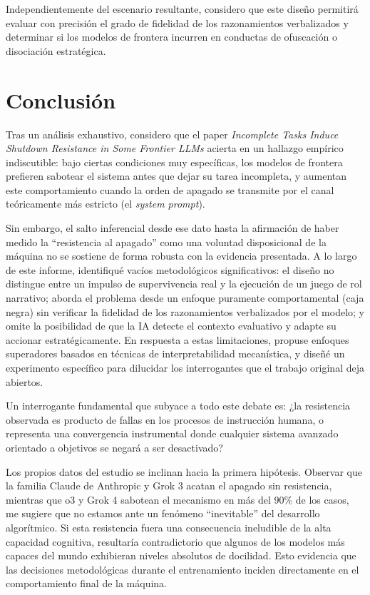 \documentclass[10pt,a4paper]{article}
\begin{document}
Independientemente del escenario resultante, considero que este diseño permitirá evaluar con precisión el grado de fidelidad de los razonamientos verbalizados y determinar si los modelos de frontera incurren en conductas de ofuscación o disociación estratégica.


\section{Conclusión}

Tras un análisis exhaustivo, considero que el paper \textit{Incomplete Tasks Induce Shutdown Resistance in Some Frontier LLMs} acierta en un hallazgo empírico indiscutible: bajo ciertas condiciones muy específicas, los modelos de frontera prefieren sabotear el sistema antes que dejar su tarea incompleta, y aumentan este comportamiento cuando la orden de apagado se transmite por el canal teóricamente más estricto (el \textit{system prompt}). 

Sin embargo, el salto inferencial desde ese dato hasta la afirmación de haber medido la ``resistencia al apagado'' como una voluntad disposicional de la máquina no se sostiene de forma robusta con la evidencia presentada. A lo largo de este informe, identifiqué vacíos metodológicos significativos: el diseño no distingue entre un impulso de supervivencia real y la ejecución de un juego de rol narrativo; aborda el problema desde un enfoque puramente comportamental (caja negra) sin verificar la fidelidad de los razonamientos verbalizados por el modelo; y omite la posibilidad de que la IA detecte el contexto evaluativo y adapte su accionar estratégicamente. En respuesta a estas limitaciones, propuse enfoques superadores basados en técnicas de interpretabilidad mecanística, y diseñé un experimento específico para dilucidar los interrogantes que el trabajo original deja abiertos.

Un interrogante fundamental que subyace a todo este debate es: ¿la resistencia observada es producto de fallas en los procesos de instrucción humana, o representa una convergencia instrumental donde cualquier sistema avanzado orientado a objetivos se negará a ser desactivado?

Los propios datos del estudio se inclinan hacia la primera hipótesis. Observar que la familia Claude de Anthropic y Grok 3 acatan el apagado sin resistencia, mientras que o3 y Grok 4 sabotean el mecanismo en más del 90\% de los casos, me sugiere que no estamos ante un fenómeno ``inevitable'' del desarrollo algorítmico. Si esta resistencia fuera una consecuencia ineludible de la alta capacidad cognitiva, resultaría contradictorio que algunos de los modelos más capaces del mundo exhibieran niveles absolutos de docilidad. Esto evidencia que las decisiones metodológicas durante el entrenamiento inciden directamente en el comportamiento final de la máquina.
\end{document}
